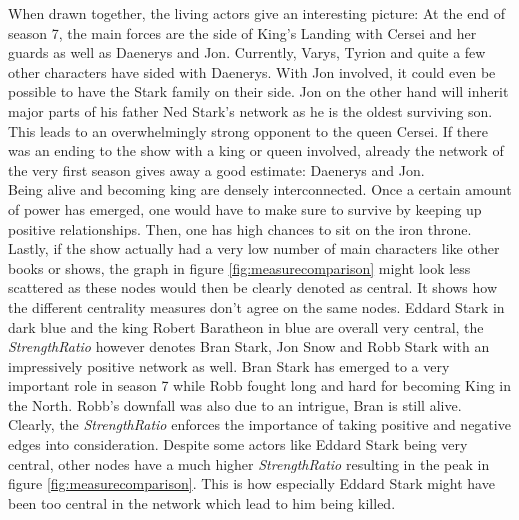 When drawn together, the living actors give an interesting picture: At the end of season 7, the main forces are the side of King's Landing with Cersei and her guards as well as Daenerys and Jon. Currently, Varys, Tyrion and quite a few other characters have sided with Daenerys. With Jon involved, it could even be possible to have the Stark family on their side. Jon on the other hand will inherit major parts of his father Ned Stark's network as he is the oldest surviving son. This leads to an overwhelmingly strong opponent to the queen Cersei. If there was an ending to the show with a king or queen involved, already the network of the very first season gives away a good estimate: Daenerys and Jon.\\
Being alive and becoming king are densely interconnected. Once a certain amount of power has emerged, one would have to make sure to survive by keeping up positive relationships. Then, one has high chances to sit on the iron throne.\\
Lastly, if the show actually had a very low number of main characters like other books or shows, the graph in figure \ref{fig:measurecomparison} might look less scattered as these nodes would then be clearly denoted as central. It shows how the different centrality measures don't agree on the same nodes. Eddard Stark in dark blue and the king Robert Baratheon in blue are overall very central, the \textit{StrengthRatio} however denotes Bran Stark, Jon Snow and Robb Stark with an impressively positive network as well. Bran Stark has emerged to a very important role in season 7 while Robb fought long and hard for becoming King in the North. Robb's downfall was also due to an intrigue, Bran is still alive. Clearly, the \textit{StrengthRatio} enforces the importance of taking positive and negative edges into consideration. Despite some actors like Eddard Stark being very central, other nodes have a much higher \textit{StrengthRatio} resulting in the peak in figure \ref{fig:measurecomparison}. This is how especially Eddard Stark might have been too central in the network which lead to him being killed.


